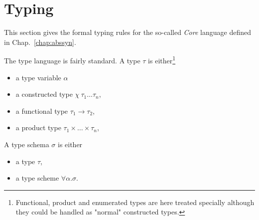 
\chapter{Typing}
\label{chap:typing}

\newcommand{\sy}[1]{\mathbf{#1}}
\newcommand{\sem}[1]{\mathsf{#1}}


This section gives the formal typing rules for the so-called \emph{Core} \caph language defined in
Chap.~\ref{chap:abssyn}. 

\medskip
The type language is fairly standard. A type $\tau$ is either\footnote{Functional, product and
  enumerated types are here treated specially although they could be handled as "normal" constructed
types.}
\begin{itemize}
\item a type variable $\alpha$
\item a constructed type $\chi\ \tau_1 \ldots \tau_n$, 
\item a functional type $\tau_1 \rightarrow \tau_2$,
\item a product type $\tau_1 \times \ldots \times \tau_n$,
\end{itemize}
A type schema $\sigma$ is either
\begin{itemize}
\item a type $\tau$,
\item a type scheme $\forall \alpha. \sigma$.
\end{itemize}

